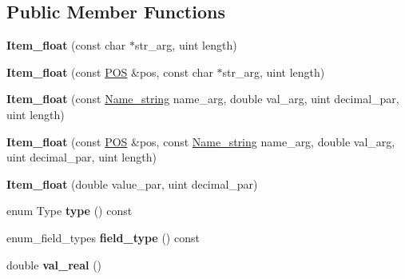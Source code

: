 \subsection*{Public Member Functions}
\begin{DoxyCompactItemize}
\item 
\mbox{\label{classItem__float_a93ebf7be2aeca3714f7fcbb19bba5b7b}} 
{\bfseries Item\+\_\+float} (const char $\ast$str\+\_\+arg, uint length)
\item 
\mbox{\label{classItem__float_ade23e1ac7d371e8f3b8b10b42d9ae1e2}} 
{\bfseries Item\+\_\+float} (const \mbox{\hyperlink{structYYLTYPE}{P\+OS}} \&pos, const char $\ast$str\+\_\+arg, uint length)
\item 
\mbox{\label{classItem__float_ade1a51f935ef72f8104d8c0dab4a7f66}} 
{\bfseries Item\+\_\+float} (const \mbox{\hyperlink{className__string}{Name\+\_\+string}} name\+\_\+arg, double val\+\_\+arg, uint decimal\+\_\+par, uint length)
\item 
\mbox{\label{classItem__float_a602f4d634498121e8a39cf5991c0a539}} 
{\bfseries Item\+\_\+float} (const \mbox{\hyperlink{structYYLTYPE}{P\+OS}} \&pos, const \mbox{\hyperlink{className__string}{Name\+\_\+string}} name\+\_\+arg, double val\+\_\+arg, uint decimal\+\_\+par, uint length)
\item 
\mbox{\label{classItem__float_a475a6054f05ba6b96ed1146a7b873ba7}} 
{\bfseries Item\+\_\+float} (double value\+\_\+par, uint decimal\+\_\+par)
\item 
\mbox{\label{classItem__float_a70ba3162c5ad492a9bc5f3c2e2e0c3ff}} 
enum Type {\bfseries type} () const
\item 
\mbox{\label{classItem__float_a81450dc775b510a897072a4fda8e5517}} 
enum\+\_\+field\+\_\+types {\bfseries field\+\_\+type} () const
\item 
\mbox{\label{classItem__float_a6bea11397389fcb75ab511cd3f60efab}} 
double {\bfseries val\+\_\+real} ()
\item 
\mbox{\label{classItem__float_a7e33e0a5ef1e1222291c06756b9fb14b}} 

\end{DoxyCompactItemize}
